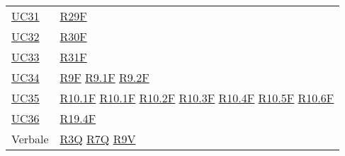 \begin{center}
\begin{longtable}[!h]{m{50px} m{50px}}
        \hyperref[sec:UC31]{UC31}         & \hyperref[tab:RequisitiFunzionali]{R29F}    \\

        \hyperref[sec:UC32]{UC32}         & \hyperref[tab:RequisitiFunzionali]{R30F}    \\

        \hyperref[sec:UC33]{UC33}         & \hyperref[tab:RequisitiFunzionali]{R31F}    \\

        \hyperref[sec:UC34]{UC34}         & \hyperref[tab:RequisitiFunzionali]{R9F}
        \newline \hyperref[tab:RequisitiFunzionali]{R9.1F}
        \newline \hyperref[tab:RequisitiFunzionali]{R9.2F}                              \\

        \hyperref[sec:UC35]{UC35}         & \hyperref[tab:RequisitiFunzionali]{R10.1F}
        \newline \hyperref[tab:RequisitiFunzionali]{R10.1F}
        \newline \hyperref[tab:RequisitiFunzionali]{R10.2F}
        \newline \hyperref[tab:RequisitiFunzionali]{R10.3F}
        \newline \hyperref[tab:RequisitiFunzionali]{R10.4F}
        \newline \hyperref[tab:RequisitiFunzionali]{R10.5F}
        \newline \hyperref[tab:RequisitiFunzionali]{R10.6F}                             \\

        \hyperref[sec:UC36]{UC36}         & \hyperref[tab:RequisitiFunzionali]{R19.4F}  \\

        Verbale                           & \hyperref[tab:RequisitiQualita]{R3Q}
        \newline \hyperref[tab:RequisitiQualita]{R7Q}                                   
        \newline \hyperref[tab:RequisitiQualita]{R9V}                                   \\
    \end{longtable}
\end{center}

